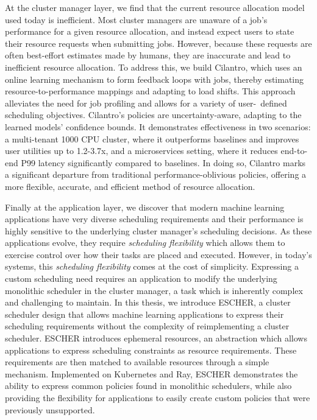 At the cluster manager layer, we find that the current resource allocation model used today is inefficient. Most cluster managers are unaware of a job's performance for a given resource allocation, and instead expect users to state their resource requests when submitting jobs. However, because these requests are often best-effort estimates made by humans, they are inaccurate and lead to inefficient resource allocation. To address this, we build Cilantro, which uses an online learning mechanism to form feedback loops with jobs, thereby estimating resource-to-performance mappings and adapting to load shifts. This approach alleviates the need for job profiling and allows for a variety of user- defined scheduling objectives. Cilantro's policies are uncertainty-aware, adapting to the learned models' confidence bounds. It demonstrates effectiveness in two scenarios: a multi-tenant 1000 CPU cluster, where it outperforms baselines and improves user utilities up to 1.2-3.7x, and a microservices setting, where it reduces end-to-end P99 latency significantly compared to baselines. In doing so, Cilantro marks a significant departure from traditional performance-oblivious policies, offering a more flexible, accurate, and efficient method of resource allocation.

Finally at the application layer, we discover that modern machine learning applications have very diverse scheduling requirements and their performance is highly sensitive to the underlying cluster manager's scheduling decisions.  As these applications evolve, they require \textit{scheduling flexibility} which allows them to exercise control over how their tasks are placed and executed. However, in today's systems, this \textit{scheduling flexibility} comes at the cost of simplicity. Expressing a custom scheduling need requires an application to modify the underlying monolithic scheduler in the cluster manager, a task which is inherently complex and challenging to maintain. In this thesis, we introduce ESCHER, a cluster scheduler design that allows machine learning applications to express their scheduling requirements without the complexity of reimplementing a cluster scheduler. ESCHER introduces ephemeral resources, an abstraction which allows applications to express scheduling constraints as resource requirements. These requirements are then matched to available resources through a simple mechanism. Implemented on Kubernetes and Ray, ESCHER demonstrates the ability to express common policies found in monolithic schedulers, while also providing the flexibility for applications to easily create custom policies that were previously unsupported. %




